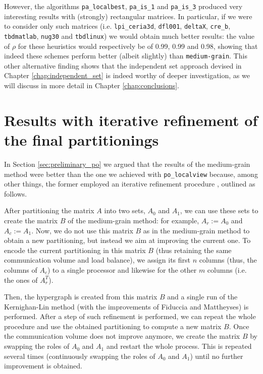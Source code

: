 However, the algorithms \verb|pa_localbest|, \verb|pa_is_1| and \verb|pa_is_3| produced very interesting results with (strongly) rectangular matrices. In particular, if we were to consider only such matrices (i.e. \verb|lpi_ceria3d|, \verb|dfl001|, \verb|deltaX|, \verb|cre_b|, \verb|tbdmatlab|, \verb|nug30| and \verb|tbdlinux|) we would obtain much better results: the value of $\rho$ for these heuristics would respectively be of 0.99, 0.99 and 0.98, showing that indeed these schemes perform better (albeit slightly) than \verb|medium-grain|. This other alternative finding shows that the independent set approach devised in Chapter \ref{chap:independent_set} is indeed worthy of deeper investigation, as we will discuss in more detail in Chapter \ref{chap:conclusions}.

\section{Results with iterative refinement of the final partitionings} \label{sec:iter_refinement}

In Section \ref{sec:preliminary_po} we argued that the results of the medium-grain method were better than the one we achieved with \verb|po_localview| because, among other things, the former employed an iterative refinement procedure \cite{mediumgrain}, outlined as follows.

After partitioning the matrix $A$ into two sets, $A_0$ and $A_1$, we can use these sets to create the matrix $B$ of the medium-grain method: for example, $A_r := A_0$ and $A_c := A_1$. Now, we do not use this matrix $B$ as in the medium-grain method to obtain a new partitioning, but instead we aim at improving the current one. To encode the current partitioning in this matrix $B$ (thus retaining the same communication volume and load balance), we assign its first $n$ columns (thus, the columns of $A_c$) to a single processor and likewise for the other $m$ columns (i.e. the ones of $A_r^T$). 

Then, the hypergraph is created from this matrix $B$ and a single run of the Kernighan-Lin method (with the improvements of Fiduccia and Mattheyses) is performed. After a step of such refinement is performed, we can repeat the whole procedure and use the obtained partitioning to compute a new matrix $B$. Once the communication volume does not improve anymore, we create the matrix $B$ by swapping the roles of $A_0$ and $A_1$ and restart the whole process. This is repeated several times (continuously swapping the roles of $A_0$ and $A_1$) until no further improvement is obtained.

